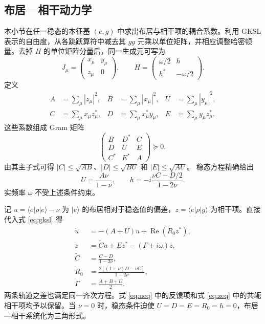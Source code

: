 \documentclass[aps,pra,reprint,amsmath,amssymb,nofootinbib,floatfix,longbibliography]{revtex4-2}
\theoremstyle{aps}
\newcommand{\ket}[1]{|#1\rangle}
\newcommand{\bra}[1]{\langle#1|}
\begin{document}
\subsection{布居—相干动力学}

本小节在任一稳态的本征基 $(e,g)$ 中求出布居与相干项的耦合系数。利用 GKSL 表示的自由度，从各跳跃算符中减去其 $gg$ 元乘以单位矩阵，并相应调整哈密顿量。去掉 $H$ 的单位矩阵分量后，同一生成元可写为
\begin{equation}\label{eq:gauge}
 J_\mu=\begin{pmatrix}x_\mu&y_\mu\\z_\mu&0\end{pmatrix},\qquad
 H=\begin{pmatrix}\omega/2&h\\h^*&-\omega/2\end{pmatrix}.
\end{equation}
定义
\begin{align}\label{eq:coefficients}
 A&=\sum_\mu|z_\mu|^2,& B&=\sum_\mu|x_\mu|^2,&
 U&=\sum_\mu|y_\mu|^2,\nonumber\\
 C&=\sum_\mu x_\mu z_\mu^*,&
 D&=\sum_\mu x_\mu^*y_\mu,&
 E&=\sum_\mu y_\mu z_\mu^*.
\end{align}
这些系数组成 Gram 矩阵
\begin{equation}\label{eq:gram}
 \begin{pmatrix}B&D^*&C\\D&U&E\\C^*&E^*&A\end{pmatrix}\succeq0,
\end{equation}
由其主子式可得
$|C|\le\sqrt{AB}$、$|D|\le\sqrt{BU}$ 和 $|E|\le\sqrt{AU}$。
稳态方程精确给出
\begin{equation}\label{eq:stationarity}
 U=\frac{A\nu}{1-\nu},\qquad
 h=-i\frac{\nu C-D/2}{1-2\nu}.
\end{equation}
实频率 $\omega$ 不受上述条件约束。

记 $u=\bra e\rho\ket e-\nu$ 为 $\ket e$ 的布居相对于稳态值的偏差，$z=\bra e\rho\ket g$ 为相干项。直接代入式 \eqref{eq:gksl} 得
\begin{align}
 \dot u&=-(A+U)u+\operatorname{Re}(R_0z^*),\label{eq:ueq}\\
 \dot z&=\widetilde C u+Ez^*-(\Gamma+i\omega)z,\label{eq:zeq}\\
 \widetilde C&=\frac{C-D}{1-2\nu},\nonumber\\
 R_0&=\frac{2[(1-\nu)D-\nu C]}{1-2\nu},\nonumber\\
 \Gamma&=\frac{A+B+U}{2}.\nonumber
\end{align}
两条轨道之差也满足同一齐次方程。式 \eqref{eq:ueq} 中的反馈项和式 \eqref{eq:zeq} 中的共轭相干项均予以保留。当 $\nu=0$ 时，稳态条件迫使 $U=D=E=R_0=h=0$，布居—相干系统化为三角形式。
\end{document}
